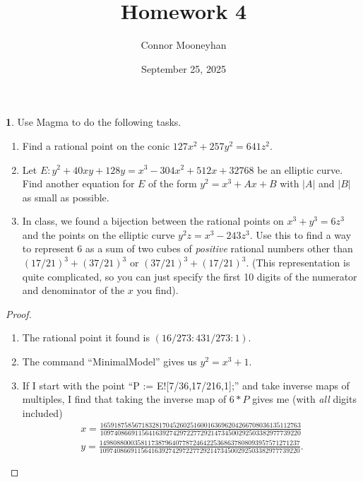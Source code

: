 \documentclass[12pt]{article}
\title{Homework 4}
\author{Connor Mooneyhan}
\date{September 25, 2025}
\theoremstyle{definition}
\newtheorem{ex}{}
\begin{document}
\maketitle

\begin{ex}
	Use Magma to do the following tasks.
	\begin{enumerate}[label=(\alph*)]
		\item Find a rational point on the conic $127x^{2} + 257y^{2} = 641z^{2}$.
		\item Let $E : y^{2} + 40xy + 128y = x^{3} - 304x^{2} + 512x + 32768$ be
		      an elliptic curve. Find another equation for $E$ of the form
		      $y^{2} = x^{3} + Ax + B$ with $|A|$ and $|B|$ as small as possible.
		\item In class, we found a bijection between the rational points on
		      $x^{3} + y^{3} = 6z^{3}$ and the points on the elliptic curve
		      $y^{2}z = x^{3} - 243z^{3}$. Use this to find a way to represent
		      $6$ as a sum of two cubes of \emph{positive} rational numbers
		      other than $(17/21)^{3} + (37/21)^{3}$ or $(37/21)^{3} + (17/21)^{3}$.
		      (This representation is quite complicated, so you can just specify
		      the first 10 digits of the numerator and denominator of the $x$ you find).
	\end{enumerate}
\end{ex}
\begin{proof}\
	\begin{enumerate}[label=(\alph*)]
		\item The rational point it found is $(16/273 : 431/273 : 1)$.
		\item The command ``MinimalModel'' gives us $y^2 = x^3 + 1$.
    \item If I start with the point ``P := E![7/36,17/216,1];'' and take inverse maps of multiples, I find that taking the inverse map of $6*P$ gives me (with \textit{all} digits included) \begin{align*}
        x = \frac{1659187585671832817045260251600163696204266708036135112763}{1097408669115641639274297227729214734500292503382977739220} \\
        y = \frac{1498088000358117387964077872464225368637808093957571271237}{1097408669115641639274297227729214734500292503382977739220}.
    \end{align*}
	\end{enumerate}
\end{proof}
\end{document}
